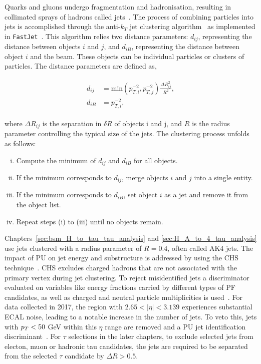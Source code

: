 Quarks and gluons undergo fragmentation and hadronisation, resulting in collimated sprays of hadrons called jets~\cite{Salam:2010nqg}. 
The process of combining particles into jets is accomplished through the anti-$k_T$ jet clustering algorithm~\cite{Cacciari:2008gp} as implemented in \texttt{FastJet}~\cite{Cacciari:2011ma}. 
This algorithm relies two distance parameters: $d_{ij}$, representing the distance between objects $i$ and $j$, and $d_{iB}$, representing the distance between object $i$ and the beam. 
These objects can be individual particles or clusters of particles. 
The distance parameters are defined as,

\begin{align}
\begin{split}
d_{ij} &= \text{min}(p_{T,i}^{-2}, p_{T,j}^{-2})  \frac{\Delta R_{ij}^{2}}{R^{2}}, \\ 
d_{iB} &= p_{T,i}^{-2}, 
\end{split}
\end{align} 
 
where $\Delta R_{ij}$ is the separation in $\delta R$ of objects i and j, and $R$ is the radius parameter controlling the typical size of the jets. 
The clustering process unfolds as follows:

\begin{enumerate}[i)]
\item Compute the minimum of $d_{ij}$ and $d_{iB}$ for all objects.
\item If the minimum corresponds to $d_{ij}$, merge objects $i$ and $j$ into a single entity.
\item If the minimum corresponds to $d_{iB}$, set object $i$ as a jet and remove it from the object list.
\item Repeat steps (i) to (iii) until no objects remain. 
\end{enumerate}

Chapters~\ref{sec:bsm_H_to_tau_tau_analysis} and \ref{sec:H_A_to_4_tau_analysis} use jets clustered with a radius parameter of $R = 0.4$, often called AK4 jets.
The impact of \ac{PU} on jet energy and substructure is addressed by using the \ac{CHS} technique~\cite{CMS:2017wyc}. 
\ac{CHS} excludes charged hadrons that are not associated with the primary vertex during jet clustering. 
To reject misidentified jets a discriminator evaluated on variables like energy fractions carried by different types of \ac{PF} candidates, as well as charged and neutral particle multiplicities is used~\cite{CMS:2017wyc}. 
For data collected in 2017, the region with $2.65 < |\eta| < 3.139$ experiences substantial \ac{ECAL} noise, leading to a notable increase in the number of jets. 
To veto this, jets with $p_{T} < 50$ GeV within this $\eta$ range are removed and a \ac{PU} jet identification discriminant~\cite{CMS:2013wea}.
For $\tau$ selections in the later chapters, to exclude selected jets from electon, muon or hadronic tau candidates, the jets are required to be separated from the selected $\tau$ candidate by $\Delta R > 0.5$.

